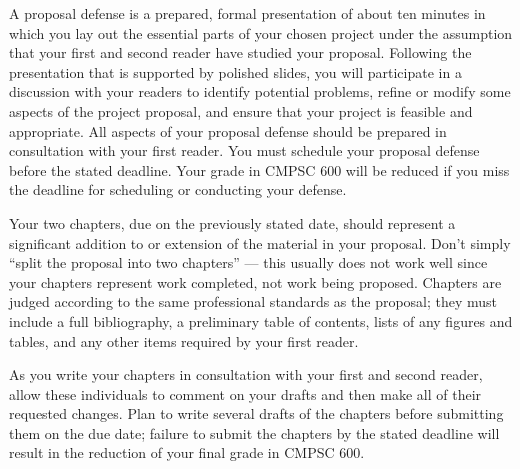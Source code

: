 
\medskip
{}
A proposal defense is a prepared, formal presentation of about ten minutes in which you lay out the essential parts of
your chosen project under the assumption that your first and second reader have studied your proposal.  Following the
presentation that is supported by polished slides, you will participate in a discussion with your readers to identify
potential problems, refine or modify some aspects of the project proposal, and ensure that your project is feasible
and appropriate. All aspects of your proposal defense should be prepared in consultation with your first reader.
You must schedule your proposal defense before the stated deadline. Your grade in CMPSC 600 will be reduced if you miss the
deadline for scheduling or conducting your defense.

%
%

\medskip
{} Your two chapters, due on the previously stated date, should represent a
significant addition to or extension of the material in your proposal. Don't simply ``split the proposal into two
chapters'' --- this usually does not work well since your chapters represent work completed, not work being proposed.
Chapters are judged according to the same professional standards as the proposal; they must include a full bibliography, a
preliminary table of contents, lists of any figures and tables, and any other items required by your first reader.

As you write your chapters in consultation with your first and second reader, allow these individuals to comment on your
drafts and then make all of their requested changes.  Plan to write several drafts of the chapters before submitting them
on the due date; failure to submit the chapters by the stated deadline will result in the reduction of your final grade
in CMPSC 600.


